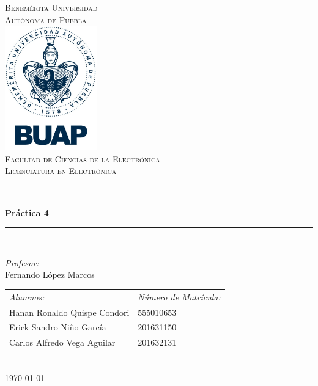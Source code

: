 \documentclass[12pt]{article}
\date{\today}
\begin{document}
\begin{titlepage}
\newcommand{\HRule}{\rule{\linewidth}{0.5mm}} 
\center
\textsc{\LARGE  Benemérita Universidad \\[0.2cm] Autónoma de Puebla}\\[1.5cm] 
\includegraphics[width=4cm]{escudo.jpg}\\[1cm]
\textsc{\Large Facultad de Ciencias de la Electrónica}\\[0.5cm] 
\textsc{\large Licenciatura en Electrónica}\\[0.5cm]
\HRule \\[0.4cm]
{ \huge \bfseries Práctica 4}\\[0.4cm] 
\HRule \\[1.5cm]
\begin{minipage}{\textwidth}
\center 

\emph{Profesor:} \\
Fernando López Marcos \\[1cm]

\begin{tabular}{ll}
\emph{Alumnos:} & \emph{Número de Matrícula:}\\
Hanan Ronaldo Quispe Condori  & 555010653 \\
Erick Sandro Niño García & 201631150\\
Carlos Alfredo Vega Aguilar & 201632131 \\
\end{tabular}
\end{minipage}\\[2cm]
\today
\end{titlepage}



\end{document}
